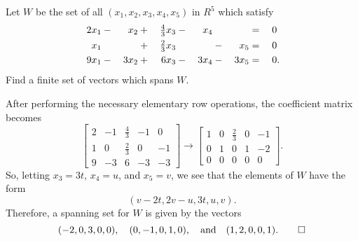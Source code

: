  Let $W$ be the set of all $(x_1,x_2,x_3,x_4,x_5)$ in $R^5$
which satisfy
\begin{alignat*}{6}
  2x_1 &{}-{}& x_2 &{}+{}& \tfrac43x_3 &{}-{}& x_4 && &{}={}& 0 \\
  x_1 && &{}+{}& \tfrac23x_3 && &{}-{}& x_5 &{}={}& 0 \\
  9x_1 &{}-{}& 3x_2 &{}+{}& 6x_3 &{}-{}& 3x_4 &{}-{}& 3x_5 &{}={}& 0\rlap.
\end{alignat*}
Find a finite set of vectors which spans $W$.
\begin{solution}
  After performing the necessary elementary row operations, the
  coefficient matrix becomes
  \begin{equation*}
    \begin{bmatrix}
      2 & -1 & \frac43 & -1 & 0 \\[3pt]
      1 & 0 & \frac23 & 0 & -1 \\[3pt]
      9 & -3 & 6 & -3 & -3
    \end{bmatrix}
    \rightarrow
    \begin{bmatrix}
      1 & 0 & \frac23 & 0 & -1 \\[3pt]
      0 & 1 & 0 & 1 & -2 \\[3pt]
      0 & 0 & 0 & 0 & 0
    \end{bmatrix}.
  \end{equation*}
  So, letting $x_3 = 3t$, $x_4 = u$, and $x_5 = v$, we see that the
  elements of $W$ have the form
  \begin{equation*}
    (v-2t, 2v-u, 3t, u, v).
  \end{equation*}
  Therefore, a spanning set for $W$ is given by the vectors
  \begin{equation*}
    (-2,0,3,0,0), \quad (0,-1,0,1,0), \quad
    \text{and}\quad
    (1,2,0,0,1). \qedhere
  \end{equation*}
\end{solution}

